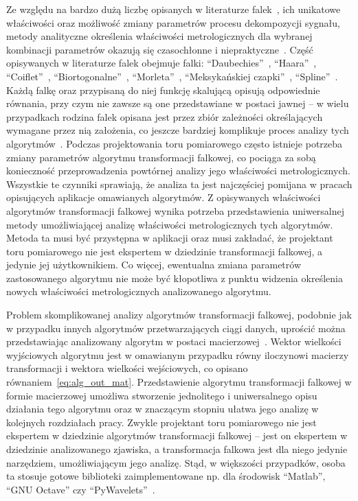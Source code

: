 Ze względu na bardzo dużą liczbę opisanych w literaturze falek~\cite{akujuobi_applications}, ich unikatowe właściwości oraz możliwość zmiany parametrów procesu dekompozycji sygnału, metody analityczne określenia właściwości metrologicznych dla wybranej kombinacji parametrów okazują się czasochłonne i niepraktyczne~\cite{yan_uncertainty, wilczok_uncertainty, peretto_uncertainty, sarrafi_uncertainty}. Część opisywanych w literaturze falek obejmuje falki: \enquote{Daubechies}~\cite{vonesch_dbbasics}, \enquote{Haara}~\cite{stankovic_haar}, \enquote{Coiflet}~\cite{wei_coiflet}, \enquote{Biortogonalne}~\cite{sweldens_bior}, \enquote{Morleta}~\cite{cohen_morlet}, \enquote{Meksykańskiej czapki}~\cite{singh_mexican}, \enquote{Spline}~\cite{averbuch_spline, wang_splinebasics}. Każdą falkę oraz przypisaną do niej funkcję skalującą opisują odpowiednie równania, przy czym nie zawsze są one przedstawiane w postaci jawnej -- w wielu przypadkach rodzina falek opisana jest przez zbiór zależności określających wymagane przez nią założenia, co jeszcze bardziej komplikuje proces analizy tych algorytmów~\cite{rowe_dbmath}. Podczas projektowania toru pomiarowego często istnieje potrzeba zmiany parametrów algorytmu transformacji falkowej, co pociąga za sobą konieczność przeprowadzenia powtórnej analizy jego właściwości metrologicznych. Wszystkie te czynniki sprawiają, że analiza ta jest najczęściej pomijana w pracach opisujących aplikacje omawianych algorytmów. Z opisywanych właściwości algorytmów transformacji falkowej wynika potrzeba przedstawienia uniwersalnej metody umożliwiającej analizę właściwości metrologicznych tych algorytmów. Metoda ta musi być przystępna w aplikacji oraz musi zakładać, że projektant toru pomiarowego nie jest ekspertem w dziedzinie transformacji falkowej, a jedynie jej użytkownikiem. Co więcej, ewentualna zmiana parametrów zastosowanego algorytmu nie może być kłopotliwa z punktu widzenia określenia nowych właściwości metrologicznych analizowanego algorytmu.

Problem skomplikowanej analizy algorytmów transformacji falkowej, podobnie jak w przypadku innych algorytmów przetwarzających ciągi danych, uprościć można przedstawiając analizowany algorytm w postaci macierzowej~\cite{jakubiec_algorithms, jakubiec_system}. Wektor wielkości wyjściowych algorytmu jest w omawianym przypadku równy iloczynowi macierzy transformacji i wektora wielkości wejściowych, co opisano równaniem~\eqref{eq:alg_out_mat}. Przedstawienie algorytmu transformacji falkowej w formie macierzowej umożliwa stworzenie jednolitego i uniwersalnego opisu działania tego algorytmu oraz w znaczącym stopniu ułatwa jego analizę w kolejnych rozdziałach pracy. Zwykle projektant toru pomiarowego nie jest ekspertem w dziedzinie algorytmów transformacji falkowej -- jest on ekspertem w dziedzinie analizowanego zjawiska, a transformacja falkowa jest dla niego jedynie narzędziem, umożliwiającym jego analizę. Stąd, w większości przypadków, osoba ta stosuje gotowe biblioteki zaimplementowane np. dla środowisk \enquote{Matlab}, \enquote{GNU Octave} czy \enquote{PyWavelets}~\cite{lee_pywavelets, misiti_matlabwav}.

